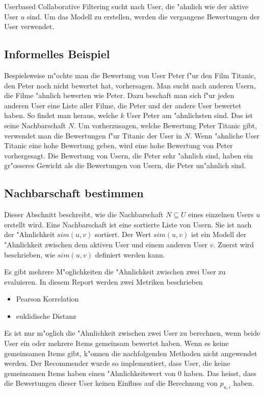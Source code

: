 \documentclass[a4paper, 12pt]{article}
\begin{document}
Userbased Collaborative Filtering sucht nach User, die "ahnlich wie der aktive User $u$ sind. Um das Modell zu erstellen, werden die vergangene Bewertungen der User verwendet.

\subsection{Informelles Beispiel}
\label{sec:example}

Bespielsweise m"ochte man die Bewertung von User Peter f"ur den Film Titanic, den Peter noch nicht bewertet hat, vorhersagen. Man sucht nach anderen Usern, die Filme "ahnlich bewerten wie Peter. Dazu beschaft man sich f"ur jeden anderen User eine Liste aller Filme, die Peter und der andere User bewertet haben. So findet man heraus, welche $k$ User Peter am "ahnlichsten sind. Das ist seine Nachbarschaft $N$. Um vorherzusagen, welche Bewertung Peter Titanic gibt, verwendet man die Bewertungen f"ur Titanic der User in $N$. Wenn "ahnliche User Titanic eine hohe Bewertung geben, wird eine hohe Bewertung von Peter vorhergesagt. Die Bewertung von Usern, die Peter sehr "ahnlich sind, haben ein gr"osseres Gewicht als die Bewertungen von Usern, die Peter un"ahnlich sind.


\subsection{Nachbarschaft bestimmen}
\label{sec:neigborhood}

Dieser Abschnitt beschreibt, wie die Nachbarschaft  $N \subseteq U$ eines einzelnen Users $u$ erstellt wird. Eine Nachbarschaft ist eine sortierte Liste von Usern. Sie ist nach der "Ahnlichkeit $sim(u,v)$ sortiert.  Der Wert $sim(u,v)$ ist ein Modell der "Ahnlichkeit zwischen dem aktiven User und einem anderen User $v$. Zuerst wird beschrieben, wie $sim(u,v)$ definiert werden kann.

Es gibt mehrere M"oglichkeiten die "Ahnlichkeit zwischen zwei User zu evaluieren. In diesem Report werden zwei Metriken beschrieben

\begin{itemize}
  \item Pearson Korrelation 
  \item euklidische Distanz
\end{itemize}

Es ist nur m"oglich die "Ahnlichkeit zwischen zwei User zu berechnen, wenn beide User ein oder mehrere Items gemeinsam bewertet haben. Wenn es keine gemeinsamen Items gibt, k"onnen die nachfolgenden Methoden nicht angewendet werden. Der Recommender wurde so implementiert, dass User, die keine gemeinsamen Items haben einen "Ahnlichkeitswert von 0 haben. Das heisst, dass die Bewertungen dieser User keinen Einfluss auf die Berechnung von $p_{u,i}$ haben. 
\end{document}
